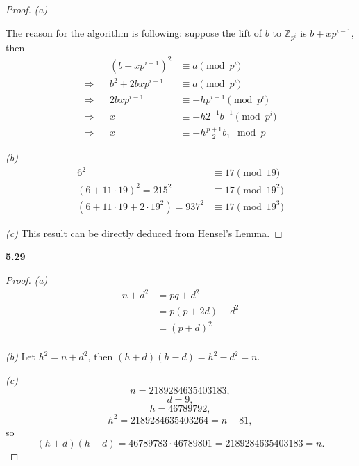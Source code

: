 \documentclass[12pt,a4paper]{article}
\newcommand{\lra}{\Longrightarrow}
\theoremstyle{solution}
\begin{document}
\begin{proof}
{\em (a) }

\medskip
{}

\medskip
The reason for the algorithm is following: suppose the lift of $b$ to $\mathbb{Z}_{p^i}$ is $b+xp^{i-1}$, then
\begin{align*}
&&(b+xp^{i-1})^2 &\equiv a \pmod{p^i}\\
\lra && b^2+2bxp^{i-1} &\equiv a \pmod{p^i}\\
\lra &&2bxp^{i-1} &\equiv -hp^{i-1} \pmod{p^i}\\
\lra &&x &\equiv -h2^{-1}b^{-1} \pmod{p^i}\\
\lra &&x &\equiv -h\frac{p+1}{2}b_1 \mod {p}
\end{align*}

{\em (b)}
\begin{align*}
6^2 &\equiv 17 \pmod{19}\\
(6+11\cdot 19)^2=215^2 &\equiv 17 \pmod{19^2}\\
(6+11 \cdot 19+2 \cdot 19^2)=937^2&\equiv 17 \pmod{19^3}
\end{align*}

{\em (c) }This result can be directly deduced from Hensel's Lemma.
\end{proof}

\textbf{5.29}

\begin{proof}
{\em (a) }
\begin{align*}
n+d^2 &=pq+d^2\\
 &=p(p+2d)+d^2\\
 &=(p+d)^2\\
\end{align*}

{\em (b) }Let $h^2=n+d^2$, then $(h+d)(h-d)=h^2-d^2=n$.

{\em (c) }
$$n=2189284635403183,$$
$$d=9,$$
$$h=46789792,$$
$$h^2=2189284635403264=n+81,$$
so
$$(h+d)(h-d)=46789783\cdot 46789801=2189284635403183=n.$$
\end{proof}
\end{document}
